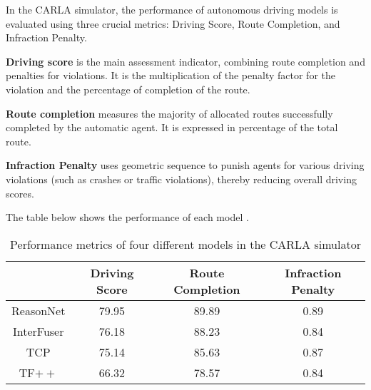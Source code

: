 In the CARLA simulator, the performance of autonomous driving models is evaluated using three crucial metrics: Driving Score, Route Completion, and Infraction Penalty\cite{carla_leaderboard}. 

\textbf{Driving score} is the main assessment indicator, combining route completion and penalties for violations. It is the multiplication of the penalty factor for the violation and the percentage of completion of the route.

\textbf{Route completion} measures the majority of allocated routes successfully completed by the automatic agent. It is expressed in percentage of the total route.

\textbf{Infraction Penalty} uses geometric sequence to punish agents for various driving violations (such as crashes or traffic violations), thereby reducing overall driving scores.

The table below shows the performance of each model \cite{paperswithcode_carla_leaderboard}.
\begin{table}[ht]
    \centering
    \begin{tabular}{cccc}
                    & Driving Score & Route Completion  & Infraction Penalty \\ \hline
        ReasonNet   & 79.95         & 89.89             & 0.89 \\ \hline
        InterFuser  & 76.18         & 88.23             & 0.84 \\ \hline
        TCP         & 75.14         & 85.63             & 0.87 \\ \hline
        TF$++$      & 66.32         & 78.57             & 0.84 \\ \hline
    \end{tabular}
    \caption{Performance metrics of four different models in the CARLA simulator}
\end{table}

